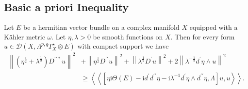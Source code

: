 \documentclass[lang=en,12pt]{beautybook}
\begin{document}
\subsection{Basic a priori Inequality}
\begin{lemma}
  Let $E$ be a hermitian vector bundle on a complex manifold $X$ equipped with a Kähler metric $\omega$. Let $\eta, \lambda>0$ be smooth functions on $X$. Then for every form $u \in \mathcal{D}\left(X, \Lambda^{p, q} T_X^{\star} \otimes E\right)$ with compact support we have
$$
\begin{aligned}
\left\|\left(\eta^{\frac{1}{2}}+\lambda^{\frac{1}{2}}\right) D^{\prime \prime *} u\right\|^2 & +\left\|\eta^{\frac{1}{2}} D^{\prime \prime} u\right\|^2+\left\|\lambda^{\frac{1}{2}} D^{\prime} u\right\|^2+2\left\|\lambda^{-\frac{1}{2}} d^{\prime} \eta \wedge u\right\|^2 \\
& \geqslant\left\langle\left\langle\left[\eta \mathrm{i} \Theta(E)-\mathrm{i} d^{\prime} d^{\prime \prime} \eta-\mathrm{i} \lambda^{-1} d^{\prime} \eta \wedge d^{\prime \prime} \eta, \Lambda\right] u, u\right\rangle\right\rangle .
\end{aligned}
$$
\end{lemma}
\end{document}
